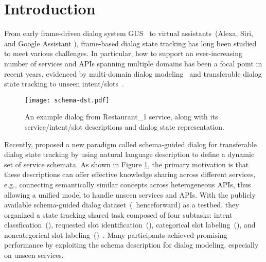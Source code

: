 \section{Introduction}
\label{sec:intro}
From early frame-driven dialog system GUS~\cite{bobrow1977gus} to
virtual assistants~(Alexa, Siri, and Google Assistant \etal),
frame-based dialog state tracking has long been studied to meet
various challenges. In particular, how to support an ever-increasing
number of services and APIs spanning multiple domains has been a focal
point in recent years, evidenced by multi-domain dialog
modeling~\cite{budzianowski2018multiwoz,byrne2019taskmaster,
  shah-etal-2018-bootstrapping} and transferable dialog state tracking
to unseen intent/slots~\cite{mrkvsic2017neural,
  wu2019transferable, hosseini2020simple}.
\begin{figure}[!ht]
\centering
  \texttt{[image: schema-dst.pdf]}
  \caption{\label{fig:schema-dst} An example dialog from Restaurant\_1 service, along with its service/intent/slot descriptions and dialog state representation.}
\end{figure}

Recently, \citet{rastogi2019towards} proposed a new paradigm called
schema-guided dialog for transferable dialog state tracking by using
natural language description to define a dynamic set of service
schemata. As shown in Figure \ref{fig:schema-dst}, the primary
motivation is that these descriptions can offer effective knowledge
sharing across different services, e.g., connecting semantically
similar concepts across heterogeneous APIs, thus allowing a unified
model to handle unseen services and APIs. With the publicly available
schema-guided dialog dataset~(\sgdst~henceforward) as a
testbed, they organized a state tracking shared task composed of four subtasks:
intent classfication~(\IC), requested slot identification~(\RSI),
categorical slot labeling~(\CSL), and noncategorical slot
labeling~(\NSL)~\cite{rastogi2020schema}. Many participants achieved
promising performance by exploiting the schema description for dialog
modeling, especially on unseen services.

